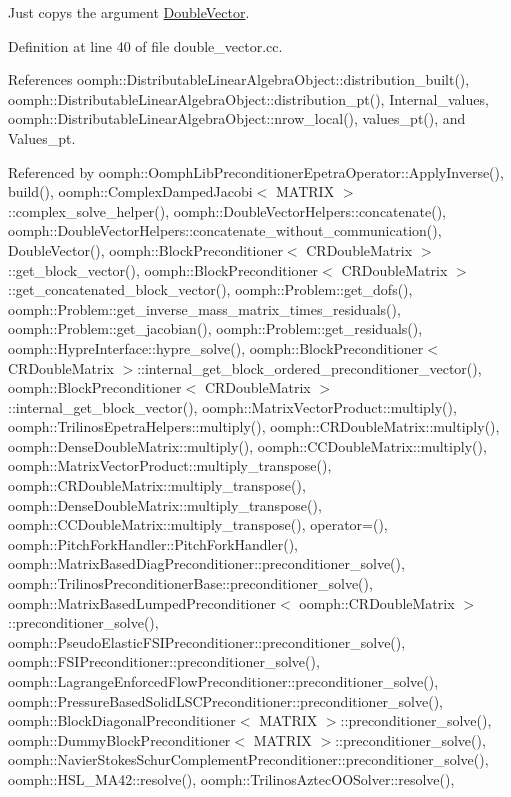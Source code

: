 Just copys the argument \hyperlink{classoomph_1_1DoubleVector}{Double\+Vector}. 



Definition at line 40 of file double\+\_\+vector.\+cc.



References oomph\+::\+Distributable\+Linear\+Algebra\+Object\+::distribution\+\_\+built(), oomph\+::\+Distributable\+Linear\+Algebra\+Object\+::distribution\+\_\+pt(), Internal\+\_\+values, oomph\+::\+Distributable\+Linear\+Algebra\+Object\+::nrow\+\_\+local(), values\+\_\+pt(), and Values\+\_\+pt.



Referenced by oomph\+::\+Oomph\+Lib\+Preconditioner\+Epetra\+Operator\+::\+Apply\+Inverse(), build(), oomph\+::\+Complex\+Damped\+Jacobi$<$ M\+A\+T\+R\+I\+X $>$\+::complex\+\_\+solve\+\_\+helper(), oomph\+::\+Double\+Vector\+Helpers\+::concatenate(), oomph\+::\+Double\+Vector\+Helpers\+::concatenate\+\_\+without\+\_\+communication(), Double\+Vector(), oomph\+::\+Block\+Preconditioner$<$ C\+R\+Double\+Matrix $>$\+::get\+\_\+block\+\_\+vector(), oomph\+::\+Block\+Preconditioner$<$ C\+R\+Double\+Matrix $>$\+::get\+\_\+concatenated\+\_\+block\+\_\+vector(), oomph\+::\+Problem\+::get\+\_\+dofs(), oomph\+::\+Problem\+::get\+\_\+inverse\+\_\+mass\+\_\+matrix\+\_\+times\+\_\+residuals(), oomph\+::\+Problem\+::get\+\_\+jacobian(), oomph\+::\+Problem\+::get\+\_\+residuals(), oomph\+::\+Hypre\+Interface\+::hypre\+\_\+solve(), oomph\+::\+Block\+Preconditioner$<$ C\+R\+Double\+Matrix $>$\+::internal\+\_\+get\+\_\+block\+\_\+ordered\+\_\+preconditioner\+\_\+vector(), oomph\+::\+Block\+Preconditioner$<$ C\+R\+Double\+Matrix $>$\+::internal\+\_\+get\+\_\+block\+\_\+vector(), oomph\+::\+Matrix\+Vector\+Product\+::multiply(), oomph\+::\+Trilinos\+Epetra\+Helpers\+::multiply(), oomph\+::\+C\+R\+Double\+Matrix\+::multiply(), oomph\+::\+Dense\+Double\+Matrix\+::multiply(), oomph\+::\+C\+C\+Double\+Matrix\+::multiply(), oomph\+::\+Matrix\+Vector\+Product\+::multiply\+\_\+transpose(), oomph\+::\+C\+R\+Double\+Matrix\+::multiply\+\_\+transpose(), oomph\+::\+Dense\+Double\+Matrix\+::multiply\+\_\+transpose(), oomph\+::\+C\+C\+Double\+Matrix\+::multiply\+\_\+transpose(), operator=(), oomph\+::\+Pitch\+Fork\+Handler\+::\+Pitch\+Fork\+Handler(), oomph\+::\+Matrix\+Based\+Diag\+Preconditioner\+::preconditioner\+\_\+solve(), oomph\+::\+Trilinos\+Preconditioner\+Base\+::preconditioner\+\_\+solve(), oomph\+::\+Matrix\+Based\+Lumped\+Preconditioner$<$ oomph\+::\+C\+R\+Double\+Matrix $>$\+::preconditioner\+\_\+solve(), oomph\+::\+Pseudo\+Elastic\+F\+S\+I\+Preconditioner\+::preconditioner\+\_\+solve(), oomph\+::\+F\+S\+I\+Preconditioner\+::preconditioner\+\_\+solve(), oomph\+::\+Lagrange\+Enforced\+Flow\+Preconditioner\+::preconditioner\+\_\+solve(), oomph\+::\+Pressure\+Based\+Solid\+L\+S\+C\+Preconditioner\+::preconditioner\+\_\+solve(), oomph\+::\+Block\+Diagonal\+Preconditioner$<$ M\+A\+T\+R\+I\+X $>$\+::preconditioner\+\_\+solve(), oomph\+::\+Dummy\+Block\+Preconditioner$<$ M\+A\+T\+R\+I\+X $>$\+::preconditioner\+\_\+solve(), oomph\+::\+Navier\+Stokes\+Schur\+Complement\+Preconditioner\+::preconditioner\+\_\+solve(), oomph\+::\+H\+S\+L\+\_\+\+M\+A42\+::resolve(), oomph\+::\+Trilinos\+Aztec\+O\+O\+Solver\+::resolve(), 